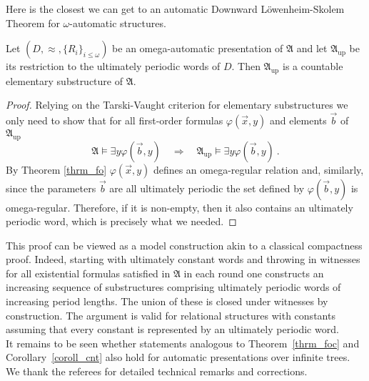 \documentclass{stacs_proc}
\newcommand{\frakA}{\mathfrak{A}}
\begin{document}
Here is the closest we can get to an automatic Downward L\"owenheim-Skolem
Theorem for $\omega$-automatic structures.

\begin{proposition} \label{prop_LS_omegaAS}
Let $(D,\approx,\{R_i\}_{i\leq\omega})$ be 
an omega-automatic presentation of $\frakA$ and let $\frakA_{\textrm{up}}$ be 
its restriction to the ultimately periodic words of $D$.
Then $\frakA_{\textrm{up}}$ is a countable elementary substructure of $\frakA$.
\end{proposition}
\begin{proof} 
Relying on the Tarski-Vaught criterion for elementary substructures 
we only need to show that for all first-order formulas $\varphi(\vec{x},y)$
and elements $\vec{b}$ of $\frakA_{\textrm{up}}$
\[ 
  \frakA \models \exists y \varphi(\vec{b},y) \quad \Rightarrow \quad 
  \frakA_{\textrm{up}} \models \exists y \varphi(\vec{b},y) \ .
\]
By Theorem \ref{thrm_fo} $\varphi(\vec{x},y)$ defines an 
omega-regular relation and, similarly, since the parameters $\vec{b}$ are 
all ultimately periodic the set defined by $\varphi(\vec{b},y)$ is omega-regular.
Therefore, if it is non-empty, then it also contains an ultimately periodic word,
which is precisely what we needed.
\end{proof}

This proof can be viewed as a model construction akin to a classical
compactness proof.  Indeed, starting with ultimately constant words and
throwing in witnesses for all existential formulas satisfied in $\frakA$ in
each round one constructs an increasing sequence of substructures comprising
ultimately periodic words of increasing period lengths. The union of these is
closed under witnesses by construction. The argument is valid for relational
structures with constants assuming that every constant is represented by an
ultimately periodic word. \\



 It remains to be seen whether statements analogous 
to Theorem~\ref{thrm_foc} and Corollary~\ref{coroll_cnt} also hold for automatic 
presentations over infinite trees. \\

 We thank the referees for detailed technical 
remarks and corrections.
\end{document}
